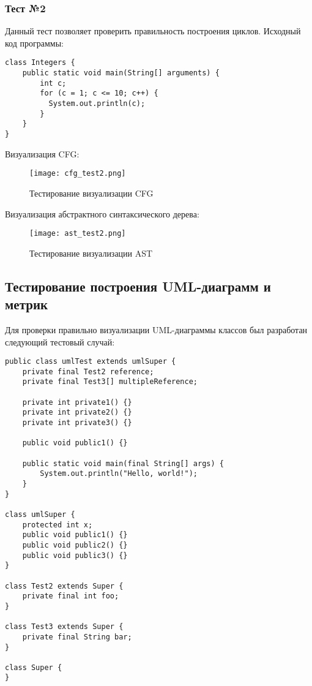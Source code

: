 \subsubsection{Тест №2}

Данный тест позволяет проверить правильность построения циклов. Исходный код
программы:

\begin{lstlisting}[caption={Тестовая программа}]
class Integers {
    public static void main(String[] arguments) {
        int c;
        for (c = 1; c <= 10; c++) {
          System.out.println(c);
        }
    }
}
\end{lstlisting}

Визуализация CFG:

\begin{figure}[h]
    \begin{center}
        \texttt{[image: cfg\_test2.png]}
    \end{center}
    \caption{Тестирование визуализации CFG}
    \label{fig:cfg_test2}
\end{figure}

Визуализация абстрактного синтаксического дерева:

\newpage
\begin{figure}[h]
    \begin{center}
        \texttt{[image: ast\_test2.png]}
    \end{center}
    \caption{Тестирование визуализации AST}
    \label{fig:ast_test2}
\end{figure}

\subsection{Тестирование построения UML-диаграмм и метрик}

Для проверки правильно визуализации UML-диаграммы классов был разработан
следующий тестовый случай:

\begin{lstlisting}[caption={Тестовая программа}]
public class umlTest extends umlSuper {
    private final Test2 reference;
    private final Test3[] multipleReference;

    private int private1() {}
    private int private2() {}
    private int private3() {}

    public void public1() {}

    public static void main(final String[] args) {
        System.out.println("Hello, world!");
    }
}

class umlSuper {
    protected int x;
    public void public1() {}
    public void public2() {}
    public void public3() {}
}

class Test2 extends Super {
    private final int foo;
}

class Test3 extends Super {
    private final String bar;
}

class Super {
}
\end{lstlisting}

